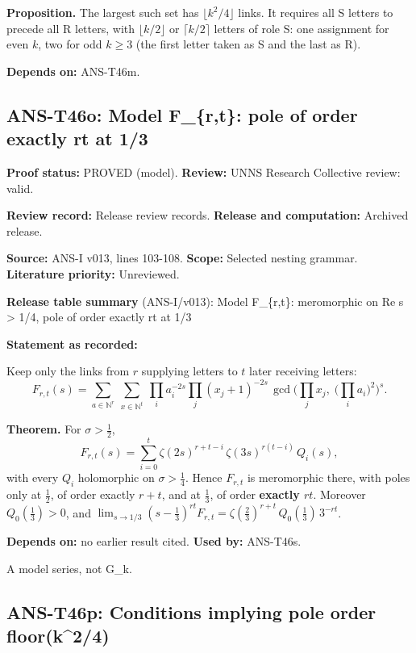 \documentclass[
  11pt,
]{article}
\begin{document}
\textbf{Proposition.} The largest such set has \(\lfloor k^2/4\rfloor\)
links. It requires all S letters to precede all R letters, with
\(\lfloor k/2\rfloor\) or \(\lceil k/2\rceil\) letters of role S: one
assignment for even \(k\), two for odd \(k\ge3\) (the first letter taken
as S and the last as R).

\textbf{Depends on:} ANS-T46m.

\hypertarget{ans-t46o-model-f_rt-pole-of-order-exactly-rt-at-13}{%
\subsection{ANS-T46o: Model F\_\{r,t\}: pole of order exactly rt at
1/3}\label{ans-t46o-model-f_rt-pole-of-order-exactly-rt-at-13}}

\textbf{Proof status:} PROVED (model). \textbf{Review:} UNNS Research
Collective review: valid.

\textbf{Review record:} Release review records. \textbf{Release and
computation:} Archived release.

\textbf{Source:} ANS-I v013, lines 103-108. \textbf{Scope:} Selected
nesting grammar. \textbf{Literature priority:} Unreviewed.

\textbf{Release table summary} (ANS-I/v013): Model F\_\{r,t\}:
meromorphic on Re s \textgreater{} 1/4, pole of order exactly rt at 1/3

\textbf{Statement as recorded:}

Keep only the links from \(r\) supplying letters to \(t\) later
receiving letters:
\[F_{r,t}(s)=\sum_{a\in\mathbb N^r}\ \sum_{x\in\mathbb N^t}\ \prod_ia_i^{-2s}\prod_j(x_j+1)^{-2s}\,\gcd\Big(\prod_jx_j,\;\big(\prod_ia_i\big)^2\Big)^s.\]

\textbf{Theorem.} For \(\sigma>\frac12\),
\[F_{r,t}(s)=\sum_{i=0}^t\zeta(2s)^{r+t-i}\,\zeta(3s)^{r(t-i)}\,Q_i(s),\]
with every \(Q_i\) holomorphic on \(\sigma>\frac14\). Hence \(F_{r,t}\)
is meromorphic there, with poles only at \(\frac12\), of order exactly
\(r+t\), and at \(\frac13\), of order \textbf{exactly \(rt\)}. Moreover
\(Q_0(\frac13)>0\), and
\(\lim_{s\to1/3}(s-\frac13)^{rt}F_{r,t}=\zeta(\frac23)^{r+t}\,Q_0(\frac13)\,3^{-rt}\).

\textbf{Depends on:} no earlier result cited. \textbf{Used by:}
ANS-T46s.

A model series, not G\_k.

\hypertarget{ans-t46p-conditions-implying-pole-order-floork24}{%
\subsection{ANS-T46p: Conditions implying pole order
floor(k\^{}2/4)}\label{ans-t46p-conditions-implying-pole-order-floork24}}
\end{document}
